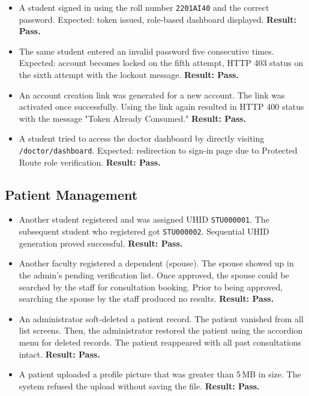 \begin{itemize}
  \item A student signed in using the roll number \texttt{2201AI40}
  and the correct password. Expected: token issued, role-based dashboard
  displayed. \textbf{Result: Pass.}

  \item The same student entered an invalid password five consecutive
  times. Expected: account becomes locked on the fifth attempt,
  HTTP 403 status on the sixth attempt with the lockout message.
  \textbf{Result: Pass.}

  \item An account creation link was generated for a new account.
  The link was activated once successfully. Using the link again
  resulted in HTTP 400 status with the message "Token Already Consumed."
  \textbf{Result: Pass.}

  \item A student tried to access the doctor dashboard by directly
  visiting \texttt{/doctor/dashboard}. Expected: redirection to sign-in
  page due to Protected Route role verification. \textbf{Result: Pass.}
\end{itemize}

\subsection{Patient Management}

\begin{itemize}
  \item Another student registered and was assigned UHID \texttt{STU000001}.
  The subsequent student who registered got \texttt{STU000002}.
  Sequential UHID generation proved successful.
  \textbf{Result: Pass.}

  \item Another faculty registered a dependent (spouse). The spouse
  showed up in the admin’s pending verification list. Once approved,
  the spouse could be searched by the staff for consultation booking.
  Prior to being approved, searching the spouse by the staff produced
  no results. \textbf{Result: Pass.}

  \item An administrator soft-deleted a patient record. The patient
  vanished from all list screens. Then, the administrator restored
  the patient using the accordion menu for deleted records. The
  patient reappeared with all past consultations intact. \textbf{Result:
    Pass.}

  \item A patient uploaded a profile picture that was greater than
  5\,MB in size. The system refused the upload without saving the
  file. \textbf{Result: Pass.}
\end{itemize}

